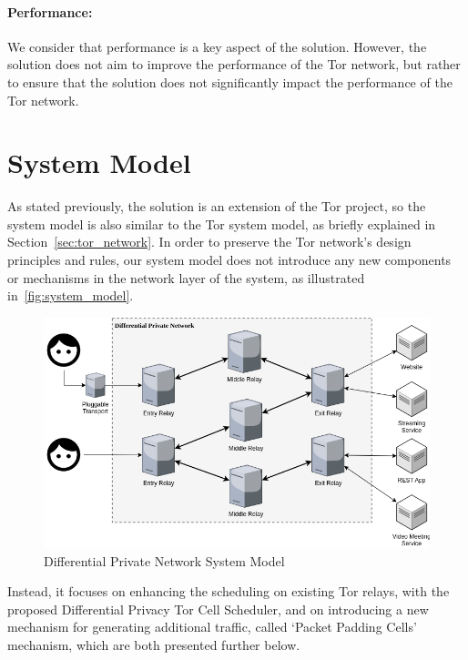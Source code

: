 \paragraph{Performance:} We consider that performance is a key aspect of the solution. However, the solution does not aim to improve the performance of the Tor network, but rather to ensure that the solution does not significantly impact the performance of the Tor network. 

\section{System Model}\label{sec:system_model}

As stated previously, the solution is an extension of the Tor project, so the system model is also similar to the Tor system model, as briefly explained in Section~\ref{sec:tor_network}. In order to preserve the Tor network's design principles and rules, our system model does not introduce any new components or mechanisms in the network layer of the system, as illustrated in~\autoref{fig:system_model}. 

\begin{figure}[!h]
  \centering
  \includegraphics[width=\textwidth]{Chapters/Figures/System_Model_Geral.png}
  \caption{Differential Private Network System Model}\label{fig:system_model}
\end{figure}

Instead, it focuses on enhancing the scheduling on existing Tor relays, with the proposed Differential Privacy Tor Cell Scheduler, and on introducing a new mechanism for generating additional traffic, called `Packet Padding Cells' mechanism, which are both presented further below.

